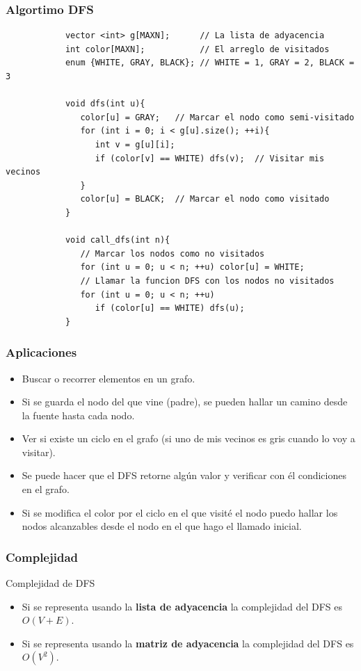 \documentclass{beamer}
\begin{document}
	\begin{frame}[fragile]
		\frametitle{Algortimo DFS}
		\begin{lstlisting}
			vector <int> g[MAXN];      // La lista de adyacencia
			int color[MAXN];           // El arreglo de visitados
			enum {WHITE, GRAY, BLACK}; // WHITE = 1, GRAY = 2, BLACK = 3

			void dfs(int u){
			   color[u] = GRAY;   // Marcar el nodo como semi-visitado
			   for (int i = 0; i < g[u].size(); ++i){
			      int v = g[u][i];
			      if (color[v] == WHITE) dfs(v);  // Visitar mis vecinos
			   }
			   color[u] = BLACK;  // Marcar el nodo como visitado
			}

			void call_dfs(int n){
			   // Marcar los nodos como no visitados
			   for (int u = 0; u < n; ++u) color[u] = WHITE;
			   // Llamar la funcion DFS con los nodos no visitados
			   for (int u = 0; u < n; ++u)
			      if (color[u] == WHITE) dfs(u);
			}
		\end{lstlisting}
	\end{frame}
	
	\begin{frame}
		\frametitle{Aplicaciones}
		\begin{itemize}
			\item Buscar o recorrer elementos en un grafo.
			\item Si se guarda el nodo del que vine (padre), se pueden hallar un camino desde la fuente hasta cada nodo.
			\item Ver si existe un ciclo en el grafo (si uno de mis vecinos es gris cuando lo voy a visitar).
			\item Se puede hacer que el DFS retorne algún valor y verificar con él condiciones en el grafo.
			\item Si se modifica el color por el ciclo en el que visité el nodo puedo hallar los nodos alcanzables desde el nodo en el que hago el llamado inicial.
		\end{itemize}
	\end{frame}
	
	\begin{frame}
		\frametitle{Complejidad}
		\begin{block}{Complejidad de DFS}
			\begin{itemize}
				\item Si se representa usando la \textbf{lista de adyacencia} la complejidad del DFS es $O(V+E)$.
				\item Si se representa usando la \textbf{matriz de adyacencia} la complejidad del DFS es $O(V^2)$.
			\end{itemize}
		\end{block}
	\end{frame}
\end{document}
